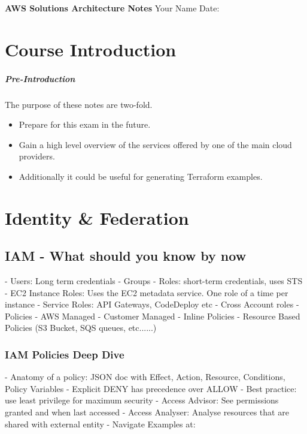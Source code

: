 \documentclass[11pt]{book}
\begin{document}
    \begin{titlepage}
        \centering
        \vspace*{2in}
        \Huge \textbf{AWS Solutions Architecture Notes}
        \vfill
        \Large Your Name
        \vfill
        \Large Date: %
    \end{titlepage}

    \newpage

    \tableofcontents
    \newpage


    \chapter{Course Introduction}

    \paragraph{Pre-Introduction}
    The purpose of these notes are two-fold.
    \begin{itemize}
        \item Prepare for this exam in the future.
        \item Gain a high level overview of the services offered by one of the main cloud providers.
        \item Additionally it could be useful for generating Terraform examples.
    \end{itemize}


    \chapter{Identity \& Federation}

    \section{IAM - What should you know by now}
    - Users: Long term credentials
    - Groups
    - Roles: short-term credentials, uses STS
    - EC2 Instance Roles: Uses the EC2 metadata service. One role of a time per instance
    - Service Roles: API Gateways, CodeDeploy etc
    - Cross Account roles
    - Policies
    - AWS Managed
    - Customer Managed
    - Inline Policies
    - Resource Based Policies (S3 Bucket, SQS queues, etc......)

    \subsection{IAM Policies Deep Dive}
    - Anatomy of a policy: JSON doc with Effect, Action, Resource, Conditions, Policy Variables
    - Explicit DENY has precedence over ALLOW
    - Best practice: use least privilege for maximum security
    - Access Advisor: See permissions granted and when last accessed
    - Access Analyser: Analyse resources that are shared with external entity
    - Navigate Examples at: %
\end{document}
